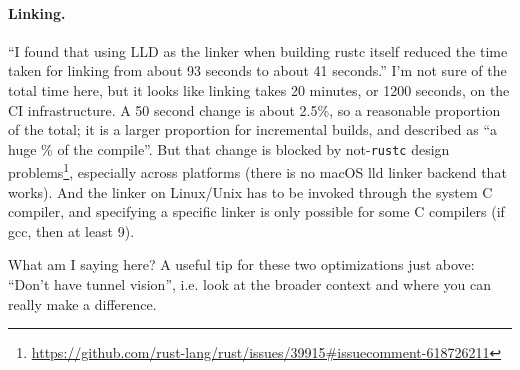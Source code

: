 \paragraph{Linking.}
``I found that using LLD as the linker when building rustc itself
reduced the time taken for linking from about 93 seconds to about 41
seconds.''  I'm not sure of the total time here, but it looks like
linking takes 20 minutes, or 1200 seconds, on the CI infrastructure. A
50 second change is about 2.5\%, so a reasonable proportion of the
total; it is a larger proportion for incremental builds, and described
as ``a huge \% of the compile''. But that change is blocked by
not-\texttt{rustc} design
problems\footnote{\url{https://github.com/rust-lang/rust/issues/39915\#issuecomment-618726211}},
especially across platforms (there is no macOS lld linker backend that
works).  And the linker on Linux/Unix has to be invoked through the
system C compiler, and specifying a specific linker is only possible
for some C compilers (if gcc, then at least 9).

What am I saying here? A useful tip for these two optimizations just
above: ``Don't have tunnel vision'', i.e. look at the broader context
and where you can really make a difference.




